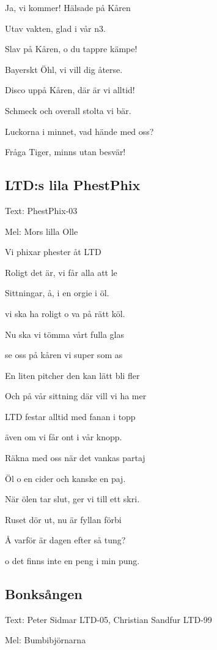 Ja, vi kommer! Hälsade på Kåren

Utav vakten, glad i vår n3.

Slav på Kåren, o du tappre kämpe!

Bayerskt Öhl, vi vill dig återse.\bigskip

Disco uppå Kåren, där är vi alltid!

Schmeck och overall stolta vi bär.

Luckorna i minnet, vad hände med oss?

Fråga Tiger, minns utan besvär!\bigskip

\subsection{\textbf{LTD:s lila PhestPhix}}

Text: PhestPhix-03

Mel: Mors lilla Olle

Vi phixar phester åt LTD

Roligt det är, vi får alla att le

Sittningar, å, i en orgie i öl.

vi ska ha roligt o va på rätt köl.\bigskip

Nu ska vi tömma vårt fulla glas

se oss på kåren vi super som as

En liten pitcher den kan lätt bli fler

Och på vår sittning där vill vi ha mer\bigskip

LTD festar alltid med fanan i topp

även om vi får ont i vår knopp.

Räkna med oss när det vankas partaj

Öl o en cider och kanske en paj.\bigskip

När ölen tar slut, ger vi till ett skri.

Ruset dör ut, nu är fyllan förbi

Å varför är dagen efter så tung?

o det finns inte en peng i min pung.\bigskip

\subsection{\textbf{Bonksången}}

Text: Peter Sidmar LTD-05, Christian Sandfur LTD-99

Mel: Bumbibjörnarna

